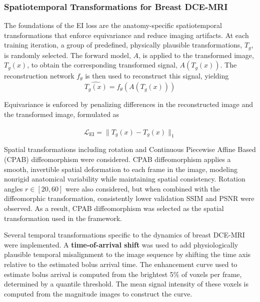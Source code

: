 \documentclass[runningheads]{llncs}
\begin{document}

\subsubsection{Spatiotemporal Transformations for Breast DCE-MRI}



The foundations of the EI loss are the anatomy-specific spatiotemporal transformations that enforce equivariance and reduce imaging artifacts. At each training iteration, a group of predefined, physically plausible transformations, $T_g$, is randomly selected. The forward model, $A$, is applied to the transformed image, $T_g(x)$, to obtain the corresponding transformed signal, $A(T_g(x))$. The reconstruction network $f_\theta$ is then used to reconstruct this
signal, yielding
\[
\hat{T_g(x)} = f_\theta\!\left(A(T_g(x))\right)
\]

Equivariance is enforced by penalizing differences in the reconstructed image and the transformed image, formulated as

\[
\mathcal{L}_{\mathrm{EI}} = \|T_g(x) - \hat{T_g(x)}\|_1 
\]

Spatial transformations including rotation and Continuous Piecewise Affine Based (CPAB) diffeomorphism were considered. CPAB diffeomorphism applies a smooth, invertible spatial deformation to each frame in the image, modeling nonrigid anatomical variability while maintaining spatial consistency. Rotation angles $r \in [20, 60]$ were also considered, but when combined with the diffeomorphic transformation, consistently lower validation SSIM and PSNR were observed. As a result, CPAB diffeomorphism was selected as the spatial transformation used in the framework. 

Several temporal transformations specific to the dynamics of breast DCE-MRI were implemented. A \textbf{time-of-arrival shift} was used to add physiologically plausible temporal misalignment to the image sequence by shifting the time axis relative to the estimated bolus arrival time. The enhancement curve used to estimate bolus arrival is computed from the brightest 5\% of voxels per frame, determined by a quantile threshold. The mean signal intensity of these voxels is computed from the magnitude images to construct the curve. 
\end{document}
